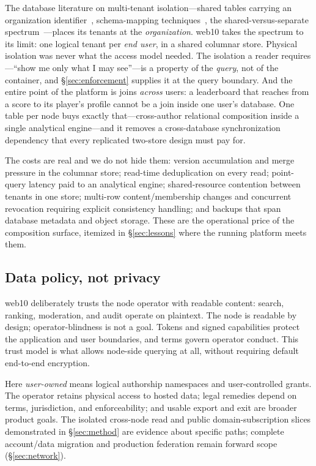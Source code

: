 \documentclass[sigconf, nonacm]{acmart}
\begin{document}
The database literature on multi-tenant isolation---shared tables carrying an
organization identifier~\cite{force2009}, schema-mapping
techniques~\cite{aulbach2008}, the shared-versus-separate
spectrum~\cite{jacobs2007}---places its tenants at the \emph{organization}.
web10 takes the spectrum to its limit: one logical tenant per \emph{end
user}, in a shared columnar store. Physical isolation was never what the
access model needed. The isolation a reader requires---``show me only what I
may see''---is a property of the \emph{query}, not of the container, and
\S\ref{sec:enforcement} supplies it at the query boundary. And the entire
point of the platform is joins \emph{across} users: a leaderboard that
reaches from a score to its player's profile cannot be a join inside one
user's database. One table per node buys exactly that---cross-author
relational composition inside a single analytical engine---and it removes a
cross-database synchronization dependency that every replicated two-store
design must pay for.

The costs are real and we do not hide them: version accumulation and merge
pressure in the columnar store; read-time deduplication on every read;
point-query latency paid to an analytical engine; shared-resource contention
between tenants in one store; multi-row content/membership changes and
concurrent revocation requiring explicit consistency handling; and backups
that span database metadata and object storage. These are the operational
price of the composition surface, itemized in \S\ref{sec:lessons} where the
running platform meets them.

\subsection{Data policy, not privacy}

web10 deliberately trusts the node operator with readable content: search,
ranking, moderation, and audit operate on plaintext. The node is readable by
design; operator-blindness is not a goal. Tokens and signed capabilities
protect the application and user boundaries, and terms govern operator
conduct. This trust model is what allows node-side querying at all, without
requiring default end-to-end encryption.

Here \emph{user-owned} means logical authorship namespaces and user-controlled
grants. The operator retains physical access to hosted data; legal remedies
depend on terms, jurisdiction, and enforceability; and usable export and exit
are broader product goals. The isolated cross-node read and public
domain-subscription slices demonstrated in \S\ref{sec:method} are evidence
about specific paths; complete account/data migration and production
federation remain forward scope (\S\ref{sec:network}).
\end{document}
